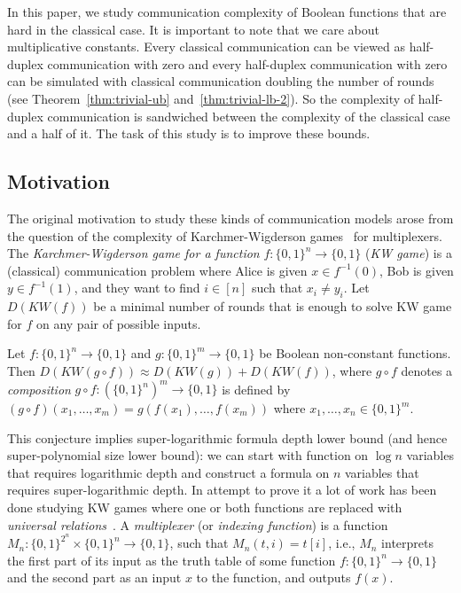 In this paper, we study communication complexity of Boolean functions that are hard in the classical case. It is important to note that we care about multiplicative constants. Every classical communication can be viewed as half-duplex communication with zero and every half-duplex communication with zero can be simulated with classical communication doubling the number of rounds (see Theorem~\ref{thm:trivial-ub} and~\ref{thm:trivial-lb-2}). 
So the complexity of half-duplex communication is sandwiched between the complexity of the classical case and a half of it. The task of this study is to improve these bounds.

\subsection{Motivation}
The original motivation to study these kinds of communication models arose from the question of the
complexity of Karchmer-Wigderson games~\cite{KW88} for multiplexers. The \emph{Karchmer-Wigderson game
for a function} $f:\{0,1\}^n\to \{0,1\}$ (\emph{KW game}) is a (classical) communication problem where Alice is given
$x\in f^{-1}(0)$, Bob is given $y\in f^{-1}(1)$, and they want to find $i\in[n]$ such that $x_i\neq
y_i$. Let $D(KW(f))$ be a minimal number of rounds that is enough to solve KW game for $f$ on any pair of possible inputs.
\begin{conjecture}
Let $f:\{0,1\}^n\to\{0,1\}$ and $g:\{0,1\}^m\to\{0,1\}$ be Boolean non-constant functions.
Then $D(KW(g\circ f))\approx D(KW(g)) + D(KW(f))$, where $g\circ f$ denotes a \emph{composition} $g\circ f : (\{0,1\}^n)^m\to\{0,1\}$ is defined by
\(
    (g\circ f)(x_1,\dotsc,x_m) = g(f(x_1),\dotsc, f(x_m))
\)
where $x_1,\dotsc,x_n\in\{0,1\}^m$.
\end{conjecture}
This conjecture implies super-logarithmic formula depth lower bound (and hence super-polynomial size lower bound): we can start with function on $\log n$ variables
that requires logarithmic depth and construct a formula on $n$ variables that requires
super-logarithmic depth.
In attempt to prove it a lot of work has been done studying KW games where one or both functions are replaced with \emph{universal relations}~\cite{HW90, EIRS01, GMWW17}. A \emph{multiplexer} (or \emph{indexing function}) is a function $M_n:\{0,1\}^{2^n}\times
\{0,1\}^n\to\{0,1\}$, such that $M_n(t,i) = t[i]$, i.e., $M_n$ interprets the first part of its input
as the truth table of some function $f:\{0,1\}^n\to\{0,1\}$ and the second part as an input $x$ to the function, and outputs $f(x)$. 
